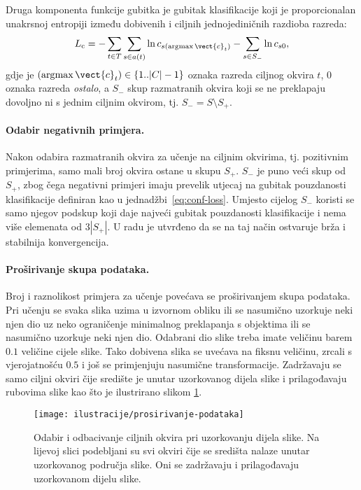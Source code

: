 \documentclass[utf8, diplomski, numeric, lmodern]{fer}
\begin{document}
Druga komponenta funkcije gubitka je gubitak klasifikacije koji je proporcionalan unakrsnoj entropiji između dobivenih i ciljnih jednojediničnih razdioba razreda:
\begin{equation} \label{eq:conf-loss}
L_\mathrm{c} = -\sum_{t \in T}\sum_{s\in a(t)}\ln c_{s(\arg\!\max\vect{c}_t)} 
-\sum_{s\in S_-}\ln c_{s0},
\end{equation}
gdje je $(\arg\!\max\vect{c}_t) \in \{1 ..\left|C\right|-1\}$ oznaka razreda ciljnog okvira $t$, $0$ oznaka razreda \emph{ostalo}, a $S_-$ skup razmatranih okvira koji se ne preklapaju dovoljno ni s jednim ciljnim okvirom, tj. $S_- = S\setminus S_+$.

\paragraph{Odabir negativnih primjera.} Nakon odabira razmatranih okvira za učenje na ciljnim okvirima, tj. pozitivnim primjerima, samo mali broj okvira ostane u skupu $S_+$. $S_-$ je puno veći skup od $S_+$, zbog čega negativni primjeri imaju prevelik utjecaj na gubitak pouzdanosti klasifikacije definiran kao u jednadžbi~\ref{eq:conf-loss}. Umjesto cijelog $S_-$ koristi se samo njegov podskup koji daje najveći gubitak pouzdanosti klasifikacije i nema više elemenata od $3\left|S_+\right|$. U radu je utvrđeno da se na taj način ostvaruje brža i stabilnija konvergencija.

\paragraph{Proširivanje skupa podataka.}
Broj i raznolikost primjera za učenje povećava se proširivanjem skupa podataka. Pri učenju se svaka slika uzima u izvornom obliku ili se nasumično uzorkuje neki njen dio uz neko ograničenje minimalnog preklapanja s objektima ili se nasumično uzorkuje neki njen dio. Odabrani dio slike treba imate veličinu barem $0.1$ veličine cijele slike. Tako dobivena slika se uvećava na fiksnu veličinu, zrcali s vjerojatnošću $0.5$ i još se primjenjuju nasumične transformacije. Zadržavaju se samo ciljni okviri čije središte je unutar uzorkovanog dijela slike i prilagođavaju rubovima slike kao što je ilustrirano slikom \ref{fig:prosirivanje-podataka}.

\begin{figure}[htbp] \centering
	\texttt{[image: ilustracije/prosirivanje-podataka]}
	\caption{Odabir i odbacivanje ciljnih okvira pri uzorkovanju dijela slike. Na lijevoj slici podebljani su svi okviri čije se središta nalaze unutar uzorkovanog područja slike. Oni se zadržavaju i prilagođavaju uzorkovanom dijelu slike.}
	\label{fig:prosirivanje-podataka}
\end{figure}
\end{document}
